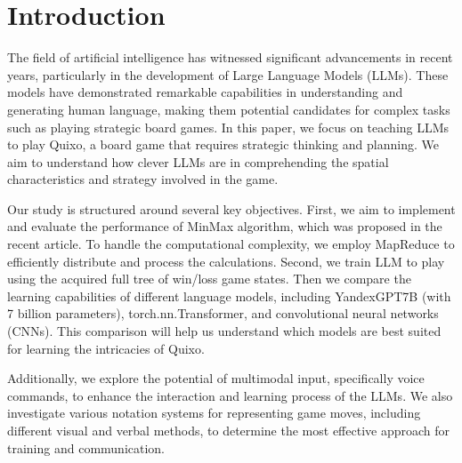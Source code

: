 \documentclass[12pt, twoside]{article}
\begin{document}

\maketitle

\section{Introduction}

The field of artificial intelligence has witnessed significant advancements in recent years, particularly in the development of Large Language Models (LLMs). These models have demonstrated remarkable capabilities in understanding and generating human language, making them potential candidates for complex tasks such as playing strategic board games. In this paper, we focus on teaching LLMs to play Quixo, a board game that requires strategic thinking and planning. We aim to understand how clever LLMs are in comprehending the spatial characteristics and strategy involved in the game.

Our study is structured around several key objectives.
 First, we aim to implement and evaluate the performance of MinMax algorithm, which was proposed in the recent article. 
 To handle the computational complexity, we employ MapReduce to efficiently distribute and process the calculations. Second, we train LLM to play using the acquired full tree of win/loss game states.
Then we compare the learning capabilities of different language models, including YandexGPT7B (with 7 billion parameters), torch.nn.Transformer, and convolutional neural networks (CNNs). 
 This comparison will help us understand which models are best suited for learning the intricacies of Quixo.

Additionally, we explore the potential of multimodal input, specifically voice commands, to enhance the interaction and learning process of the LLMs. 
We also investigate various notation systems for representing game moves, including different visual and verbal methods, to determine the most effective approach for training and communication.
\end{document}
